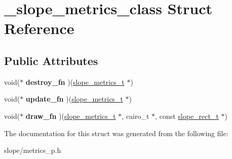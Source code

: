 \hypertarget{struct__slope__metrics__class}{\section{\+\_\+slope\+\_\+metrics\+\_\+class Struct Reference}
\label{struct__slope__metrics__class}
}
\subsection*{Public Attributes}
\begin{DoxyCompactItemize}
\item 
\hypertarget{struct__slope__metrics__class_a4368bec8121a13cd6f65bfd004237345}{void($\ast$ {\bfseries destroy\+\_\+fn} )(\hyperlink{group__Metrics_gab80787ee8ae8dc449e770249fe0e3c35}{slope\+\_\+metrics\+\_\+t} $\ast$)}\label{struct__slope__metrics__class_a4368bec8121a13cd6f65bfd004237345}

\item 
\hypertarget{struct__slope__metrics__class_afdb9e43174fa9f4cacfa7dce2b5e8368}{void($\ast$ {\bfseries update\+\_\+fn} )(\hyperlink{group__Metrics_gab80787ee8ae8dc449e770249fe0e3c35}{slope\+\_\+metrics\+\_\+t} $\ast$)}\label{struct__slope__metrics__class_afdb9e43174fa9f4cacfa7dce2b5e8368}

\item 
\hypertarget{struct__slope__metrics__class_adc93586637602cdb8805965d29de2ab0}{void($\ast$ {\bfseries draw\+\_\+fn} )(\hyperlink{group__Metrics_gab80787ee8ae8dc449e770249fe0e3c35}{slope\+\_\+metrics\+\_\+t} $\ast$, cairo\+\_\+t $\ast$, const \hyperlink{struct__slope__rect}{slope\+\_\+rect\+\_\+t} $\ast$)}\label{struct__slope__metrics__class_adc93586637602cdb8805965d29de2ab0}

\end{DoxyCompactItemize}


The documentation for this struct was generated from the following file\+:\begin{DoxyCompactItemize}
\item 
slope/metrics\+\_\+p.\+h\end{DoxyCompactItemize}
